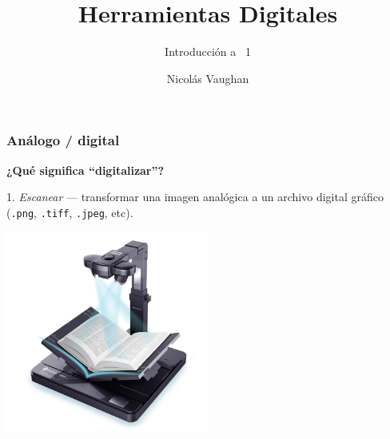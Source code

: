 \documentclass[%
  handout, %
  ]{beamer}
\title{Herramientas Digitales}
\subtitle{Introducción a \TEI\ 1}
\author{Nicolás Vaughan}
\institute[UA]
{\footnotesize
Universidad de los Andes \\
\medskip
\texttt{n.vaughan@uniandes.edu.co}
}
\date[\tiny\mydate]{\scriptsize\mydate}
\newcommand*{\rojo}[1]{\textcolor[HTML]{8B0000}{#1}}
\newcommand*{\rojoit}[1]{\textit{\textcolor[HTML]{8B0000}{#1}}}
\newcommand{\Azul}{\color{bluenivaca}}
\begin{document}
\begin{frame}
  \titlepage
\end{frame}



\begin{frame}
  \frametitle{Análogo / digital}
  
  {\large\Azul\textbf{¿Qué significa \enquote{digitalizar}?}}

  \bigskip

  \rojo{1.} \rojoit{Escanear} --- transformar una imagen analógica a un archivo digital gráfico (\texttt{.png}, \texttt{.tiff}, \texttt{.jpeg}, etc).

  \begin{center}
    \includegraphics[width=0.5\textwidth]{img/scanning.png}
  \end{center}

\end{frame}
\end{document}
